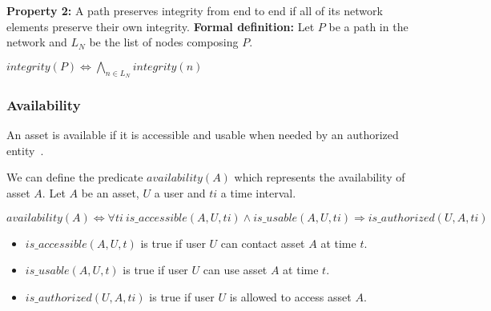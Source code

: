 \textbf{Property 2:} A path preserves integrity from end to end if all of its network elements preserve their own integrity.
\newline \textbf{Formal definition:} Let $P$ be a path in the network and $L_N$ be the list of nodes composing $P$.
\newline

\begin{myformula}
$integrity(P) \Leftrightarrow \bigwedge\limits_{n \in L_N}integrity(n) $
\end{myformula}


\subsubsection{Availability}
\label{sec:prop-avail}
An asset is available if it is accessible and usable when
needed by an authorized entity~\cite{ISO/IEC270012013}.

We can define the predicate $availability(A)$ which represents the availability of asset $A$.
\newline
Let $A$ be an asset, $U$ a user and $ti$ a time interval.
\newline

\begin{myformula}
$availability(A) \Leftrightarrow \forall ti~is\_accessible(A,U,ti) \wedge is\_usable(A,U,ti) \Rightarrow is\_authorized(U,A,ti)$
\end{myformula}

\begin{itemize}
\item $is\_accessible(A,U,t)$ is true if user $U$ can contact asset $A$ at time $t$.
\item $is\_usable(A,U,t)$ is true if user $U$ can use asset $A$ at time $t$.
\item $is\_authorized(U,A,ti)$ is true if user $U$ is allowed to access asset $A$.
\end{itemize}

